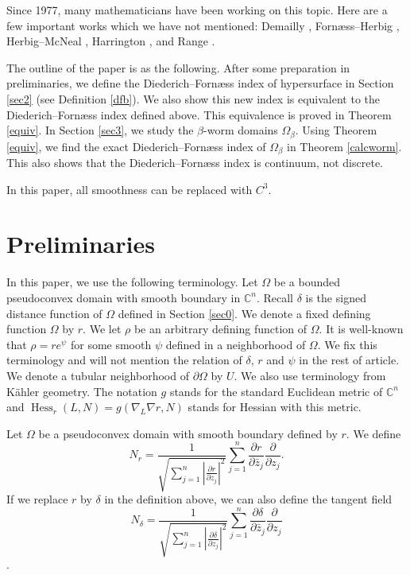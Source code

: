 \documentclass[11pt]{article}
\theoremstyle{plain} \numberwithin{equation}{section}
\theoremstyle{definition}
\DeclareMathOperator{\Hessian}{Hess}
\begin{document}
Since 1977, many mathematicians have been working on this topic. Here are a few important works which we have not mentioned: Demailly \citep{De87}, Forn\ae ss--Herbig \citep{FH08}, Herbig--McNeal \citep{HM12b}, Harrington \citep{Ha08}, and Range \citep{Ra81}.  

 The outline of the paper is as the following. After some preparation in preliminaries, we define the Diederich--Forn\ae ss index of hypersurface in Section \ref{sec2} (see Definition \ref{dfb}). We also show this new index is equivalent to the Diederich--Forn\ae ss index defined above. This equivalence is proved in Theorem \ref{equiv}. In Section \ref{sec3}, we study the $\beta$-worm domains $\Omega_\beta$. Using Theorem \ref{equiv}, we find the exact Diederich--Forn\ae ss index of $\Omega_\beta$ in Theorem \ref{calcworm}. This also shows that the Diederich--Forn\ae ss index is continuum, not discrete.

In this paper, all smoothness can be replaced with $C^3$.


	\section{Preliminaries}\label{sec1}
	
	In this paper, we use the following terminology. Let $\Omega$ be a bounded pseudoconvex domain with smooth boundary in $\mathbb{C}^n$. Recall $\delta$ is the signed distance function of $\Omega$ defined in Section \ref{sec0}. We  denote a fixed defining function $\Omega$ by $r$. We let $\rho$ be an arbitrary defining function of $\Omega$. It is well-known that $\rho=re^\psi$ for some smooth $\psi$ defined in a neighborhood of $\Omega$. We fix this terminology and will not mention the relation of $\delta$, $r$ and $\psi$ in the rest of article. We denote a tubular neighborhood of $\partial\Omega$ by $U$. We also use terminology from K\"{a}hler geometry. The notation $g$ stands for the standard Euclidean metric of $\mathbb{C}^n$ and $\Hessian_r(L, N)=g(\nabla_L\nabla r, N)$ stands for Hessian with this metric.
	
Let $\Omega$ be a pseudoconvex domain with smooth boundary defined by $r$. We define 
\[N_r=\frac{1}{\sqrt{\sum_{j=1}^{n}|\frac{\partial r}{\partial z_j}|^2}}\sum_{j=1}^{n}\frac{\partial r}{\partial \bar{z}_j}\frac{\partial}{\partial z_j}.\] If we replace $r$ by $\delta$ in the definition above, we can also define the tangent field \[N_\delta=\frac{1}{\sqrt{\sum_{j=1}^{n}|\frac{\partial \delta}{\partial z_j}|^2}}\sum_{j=1}^{n}\frac{\partial \delta}{\partial \bar{z}_j}\frac{\partial}{\partial z_j}\]. 
\end{document}
